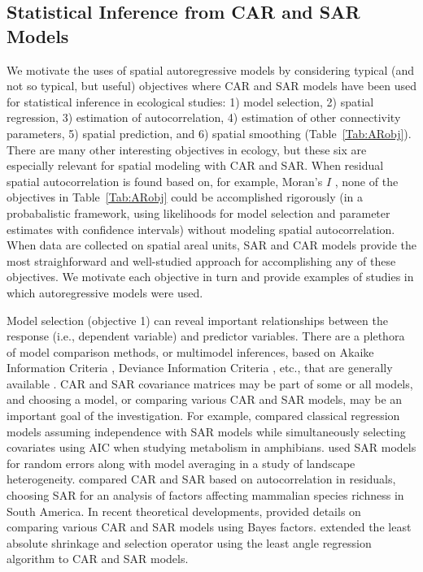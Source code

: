 \documentclass[11pt, titlepage]{article}\usepackage[]{graphicx}\usepackage[]{color}
\begin{document}
\begin{spacing}{1.9}
\begin{flushleft}
\subsection*{Statistical Inference from CAR and SAR Models}

We motivate the uses of spatial autoregressive models by considering typical (and not so typical, but useful) objectives where CAR and SAR models have been used for statistical inference in ecological studies: 1) model selection, 2) spatial regression, 3) estimation of autocorrelation, 4) estimation of other connectivity parameters, 5) spatial prediction, and 6) spatial smoothing (Table~\ref{Tab:ARobj}).  There are many other interesting objectives in ecology, but these six are especially relevant for spatial modeling with CAR and SAR. When residual spatial autocorrelation is found based on, for example, Moran's $I$ \citep{Mora:inte:1948,Soka:Oden:spat:1978}, none of the objectives in Table~\ref{Tab:ARobj} could be accomplished rigorously (in a probabalistic framework, using likelihoods for model selection and parameter estimates with confidence intervals) without modeling spatial autocorrelation.  When data are collected on spatial areal \citep[also called lattice,][]{Cres:stat:1993} units, SAR and CAR models provide the most straighforward and well-studied approach for accomplishing any of these objectives.  We motivate each objective in turn and provide examples of studies in which autoregressive models were used.

Model selection (objective 1) can reveal important relationships between the response (i.e., dependent variable) and predictor variables.  There are a plethora of model comparison methods, or multimodel inferences, based on Akaike Information Criteria \citep[AIC,][]{Akai:Info:1973}, Deviance Information Criteria \citep[DIC,][]{Spie:Best:Carl:Van:Baye:2002}, etc., that are generally available \citep[e.g.,][]{Burn:Ande:mode:2002,Hoot:Hobb:guid:2015}.  CAR and SAR covariance matrices may be part of some or all models, and choosing a model, or comparing various CAR and SAR models, may be an important goal of the investigation. For example, \citet{Cass:Dini:Rang:Thia:spat:2007} compared classical regression models assuming independence with SAR models while simultaneously selecting covariates using AIC when studying metabolism in amphibians. \citet{Qui:Turn:impo:2015} used SAR models for random errors along with model averaging in a study of landscape heterogeneity. \citet{Togn:Kelt:anal:2004} compared CAR and SAR based on autocorrelation in residuals, choosing SAR for an analysis of factors affecting mammalian species richness in South America.  In recent theoretical developments, \citet{Song:DeOl:Baye:2012} provided details on comparing various CAR and SAR models using Bayes factors. \citet{Zhu:Huan:Reye:sele:2010} extended the least absolute shrinkage and selection operator \citep[LASSO, ][]{Tibs:regr:1996} using the least angle regression algorithm \citep[LARS, ][]{Efro:Hast:John:Tibs:leas:2004} to CAR and SAR models. 


\end{flushleft}
\end{spacing}
\end{document}
